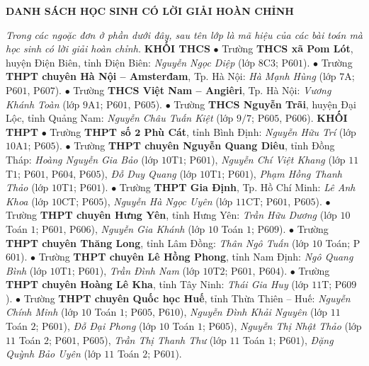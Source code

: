 \begin{center}
	\textbf{\color{thachthuctoanhoc}DANH SÁCH HỌC SINH CÓ LỜI GIẢI HOÀN CHỈNH}
\end{center}
\begin{multicols}{2}
	\textit{Trong các ngoặc đơn ở phần dưới đây, sau tên lớp là mã hiệu của các bài toán mà học sinh có lời giải hoàn chỉnh.}
	\vskip 0.05cm
	\textbf{\color{thachthuctoanhoc}KHỐI THCS}
	\vskip 0.05cm
	$\bullet$ Trường \textbf{\color{thachthuctoanhoc}THCS xã Pom Lót}, huyện Điện Biên, tỉnh Điện Biên: \textit{Nguyễn Ngọc Diệp} (lớp $8$C$3$; P$601$).
	\vskip 0.05cm
	$\bullet$ Trường \textbf{\color{thachthuctoanhoc}THPT chuyên Hà Nội -- Amsterđam}, Tp. Hà Nội: \textit{Hà Mạnh Hùng} (lớp $7$A; P$601$, P$607$).
	\vskip 0.05cm
	$\bullet$ Trường \textbf{\color{thachthuctoanhoc}THCS Việt Nam -- Angiêri}, Tp. Hà Nội: \textit{Vương Khánh Toàn} (lớp $9$A$1$; P$601$, P$605$).
	\vskip 0.05cm
	$\bullet$ Trường \textbf{\color{thachthuctoanhoc}THCS Nguyễn Trãi}, huyện Đại Lộc, tỉnh Quảng Nam: \textit{Nguyễn Châu Tuấn Kiệt} (lớp $9/7$; P$605$, P$606$).
	\vskip 0.05cm
	\textbf{\color{thachthuctoanhoc}KHỐI THPT}
	\vskip 0.05cm
	$\bullet$ Trường \textbf{\color{thachthuctoanhoc}THPT số $\pmb{2}$ Phù Cát}, tỉnh Bình Định: \textit{Nguyễn Hữu Trí} (lớp $10$A$1$; P$605$).
	\vskip 0.05cm
	$\bullet$ Trường \textbf{\color{thachthuctoanhoc}THPT chuyên Nguyễn Quang Diêu}, tỉnh Đồng Tháp: \textit{Hoàng Nguyễn Gia Bảo} (lớp $10$T$1$; P$601$), \textit{Nguyễn Chí Việt Khang} (lớp $11$T$1$; P$601$, P$604$, P$605$), \textit{Đỗ Duy Quang} (lớp $10$T$1$; P$601$), \textit{Phạm Hồng Thanh Thảo} (lớp $10$T$1$; P$601$).
	\vskip 0.05cm
	$\bullet$ Trường \textbf{\color{thachthuctoanhoc}THPT Gia Định}, Tp. Hồ Chí Minh: \textit{Lê Anh Khoa} (lớp $10$CT; P$605$), \textit{Nguyễn Hà Ngọc Uyên} (lớp $11$CT; P$601$, P$605$).
	\vskip 0.05cm
	$\bullet$ Trường \textbf{\color{thachthuctoanhoc}THPT chuyên Hưng Yên}, tỉnh Hưng Yên: \textit{Trần Hữu Dương} (lớp $10$ Toán $1$; P$601$, P$606$), \textit{Nguyễn Gia Khánh} (lớp $10$ Toán $1$; P$609$).
	\vskip 0.05cm
	$\bullet$ Trường \textbf{\color{thachthuctoanhoc}THPT chuyên Thăng Long}, tỉnh Lâm Đồng: \textit{Thân Ngô Tuấn} (lớp $10$ Toán; P$601$).
	\vskip 0.05cm
	$\bullet$ Trường \textbf{\color{thachthuctoanhoc}THPT chuyên Lê Hồng Phong}, tỉnh Nam Định: \textit{Ngô Quang Bình} (lớp $10$T$1$; P$601$), \textit{Trần Đình Nam} (lớp $10$T$2$; P$601$, P$604$).
	\vskip 0.05cm
	$\bullet$ Trường \textbf{\color{thachthuctoanhoc}THPT chuyên Hoàng Lê Kha}, tỉnh Tây Ninh: \textit{Thái Gia Huy} (lớp $11$T; P$609$).
	\vskip 0.05cm
	$\bullet$ Trường \textbf{\color{thachthuctoanhoc}THPT chuyên Quốc học Huế}, tỉnh Thừa Thiên -- Huế: \textit{Nguyễn Chính Minh} (lớp $10$ Toán $1$; P$605$, P$610$), \textit{Nguyễn Đình Khải Nguyên} (lớp $11$ Toán $2$; P$601$), \textit{Đỗ Đại Phong} (lớp $10$ Toán $1$; P$605$), \textit{Nguyễn Thị Nhật Thảo} (lớp $11$ Toán $2$; P$601$, P$605$), \textit{Trần Thị Thanh Thư} (lớp $11$ Toán $1$; P$601$), \textit{Đặng Quỳnh Bảo Uyên} (lớp $11$ Toán $2$; P$601$).

\end{multicols}
